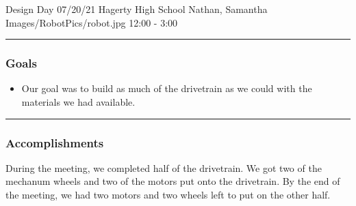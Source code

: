\insertmeeting 
	{Design Day} 
	{07/20/21}
	{Hagerty High School}
	{Nathan, Samantha}
	{Images/RobotPics/robot.jpg}
	{12:00 - 3:00}
	
\noindent\hfil\rule{\textwidth}{.4pt}\hfil
\subsubsection*{Goals}
\begin{itemize}
    \item Our goal was to build as much of the drivetrain as we could with the materials we had available.  

\end{itemize} 

\noindent\hfil\rule{\textwidth}{.4pt}\hfil

\subsubsection*{Accomplishments}
During the meeting, we completed half of the drivetrain. We got two of the mechanum wheels and two of the motors put onto the drivetrain. By the end of the meeting, we had two motors and two wheels left to put on the other half. 







